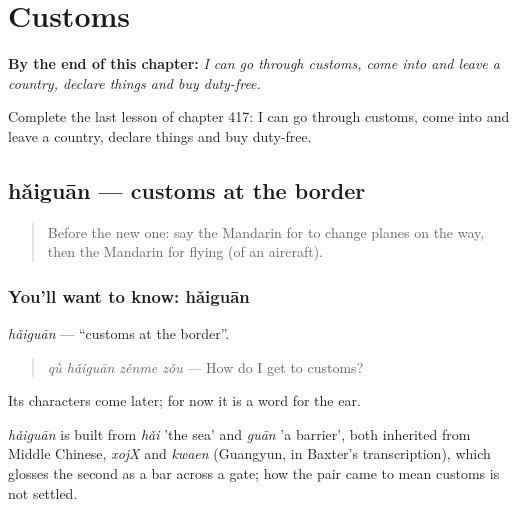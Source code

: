 
\chapter{Customs}
\label{ch:zh-customs}

\begin{chapteropening}
\textbf{By the end of this chapter:} \emph{I can go through customs, come into and leave a country, declare things and buy duty-free.}

Complete the last lesson of chapter 417: I can go through customs, come into and leave a country, declare things and buy duty-free.
\end{chapteropening}

\section[hǎiguān]{hǎiguān — customs at the border}

\label{lesson:ZH-C417-haiguan}



\begin{quote}
Before the new one: say the Mandarin for to change planes on the way, then the Mandarin for flying (of an aircraft).
\end{quote}

\subsection*{You'll want to know: hǎiguān}
\emph{hǎiguān} — \textquotedblleft{}customs at the border\textquotedblright{}.

\begin{quote}
\emph{qù hǎiguān zěnme zǒu} — How do I get to customs?
\end{quote}

Its characters come later; for now it is a word for the ear.

\begin{cousinweb}
\emph{hǎiguān} is built from \emph{hǎi} 'the sea' and \emph{guān} 'a barrier', both inherited from Middle Chinese, \emph{xojX} and \emph{kwaen} (Guangyun, in Baxter's transcription), which glosses the second as a bar across a gate; how the pair came to mean customs is not settled.
\end{cousinweb}

